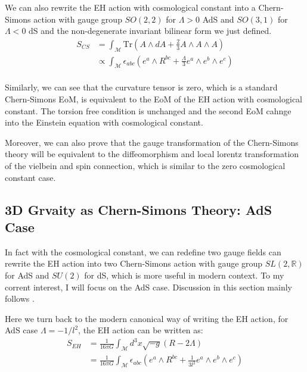 We can also rewrite the EH action with cosmological constant into a
Chern-Simons action with gauge group $ SO(2,2) $ for $ \Lambda>0 $ AdS and
$ SO(3,1) $ for $ \Lambda<0 $ dS and the
non-degenerate invariant bilinear form we just defined.
\begin{align}
  S_{CS} & = \int_{\mathcal{M}} \mathrm{Tr}\left( A \wedge dA + \frac{2}{3} A
  \wedge A \wedge A \right) \\
  & \propto \int_{\mathcal{M}} \epsilon_{abc} \left( e^a \wedge R^{bc} +
  \frac{\Lambda}{3} e^a \wedge e^b \wedge e^c \right) \\
\end{align}

Similarly, we can see that the curvature tensor is zero, which is a
standard Chern-Simons EoM, is equivalent to the EoM of the EH action
with cosmological constant. The torsion free condition is unchanged
and the second EoM cahnge into the Einstein equation with cosmological constant.

Moreover, we can also prove that the gauge transformation of the
Chern-Simons theory will be equivalent to the diffeomorphism and
local lorentz transformation of the vielbein and spin connection,
which is similar to the zero cosmological constant case.

\subsection{3D Grvaity as Chern-Simons Theory: AdS Case}\label{sec:AdSCS}

In fact with the cosmological constant, we can redefine two gauge
fields can rewrite the EH action into two Chern-Simons action with
gauge group $ SL(2,\mathbb{R}) $ for AdS and $ SU(2) $ for dS, which
is more useful in modern context. To my corrent interest, I will
focus on the AdS case. Discussion in this section mainly follows
\cite{compereAdvancedLecturesGeneral2019a}.

Here we turn back to the modern canonical way of writing the EH
action, for AdS case $ \Lambda = -1/l^2 $, the EH action can be written as:
\begin{align}
  S_{EH} &= \displaystyle\frac{1}{16 \pi G} \int_{\mathcal{M}} d^3 x
  \sqrt{-g} (R - 2 \Lambda)  \\
  &= \displaystyle\frac{1}{16 \pi G} \int_{\mathcal{M}} \epsilon_{abc}
  \left( e^a \wedge R^{bc} + \frac{1}{3 l^2} e^a \wedge e^b \wedge e^c \right)
\end{align}

